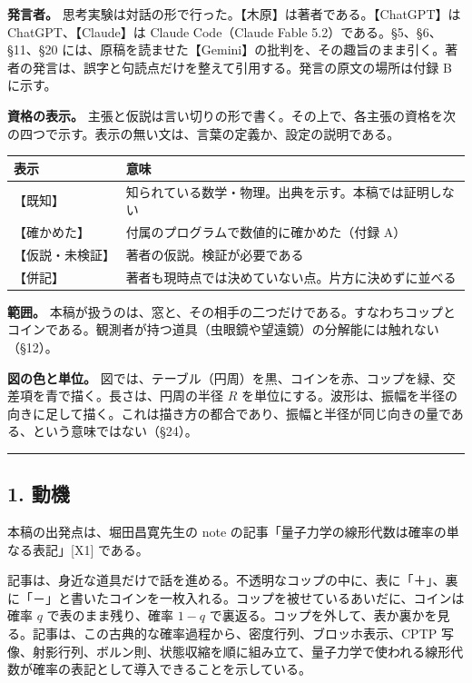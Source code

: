 \documentclass[
  a4paper,
]{ltjsarticle}
\newcounter{none} %
\begin{document}
\textbf{発言者。}
思考実験は対話の形で行った。【木原】は著者である。【ChatGPT】は
ChatGPT、【Claude】は Claude Code（Claude Fable
5.2）である。§5、§6、§11、§20
には、原稿を読ませた【Gemini】の批判を、その趣旨のまま引く。著者の発言は、誤字と句読点だけを整えて引用する。発言の原文の場所は付録
B に示す。

\textbf{資格の表示。}
主張と仮説は言い切りの形で書く。その上で、各主張の資格を次の四つで示す。表示の無い文は、言葉の定義か、設定の説明である。

{\def\LTcaptype{none} %
\begin{longtable}[]{@{}ll@{}}
\toprule\noalign{}
表示 & 意味 \\
\midrule\noalign{}
\endhead
\bottomrule\noalign{}
\endlastfoot
【既知】 & 知られている数学・物理。出典を示す。本稿では証明しない \\
【確かめた】 & 付属のプログラムで数値的に確かめた（付録 A） \\
【仮説・未検証】 & 著者の仮説。検証が必要である \\
【併記】 & 著者も現時点では決めていない点。片方に決めずに並べる \\
\end{longtable}
}

\textbf{範囲。}
本稿が扱うのは、窓と、その相手の二つだけである。すなわちコップとコインである。観測者が持つ道具（虫眼鏡や望遠鏡）の分解能には触れない（§12）。

\textbf{図の色と単位。}
図では、テーブル（円周）を黒、コインを赤、コップを緑、交差項を青で描く。長さは、円周の半径
\(R\)
を単位にする。波形は、振幅を半径の向きに足して描く。これは描き方の都合であり、振幅と半径が同じ向きの量である、という意味ではない（§24）。

\begin{center}\rule{0.5\linewidth}{0.5pt}\end{center}

\subsection{1. 動機}\label{ux52d5ux6a5f}

本稿の出発点は、堀田昌寛先生の note
の記事「量子力学の線形代数は確率の単なる表記」{[}X1{]} である。

記事は、身近な道具だけで話を進める。不透明なコップの中に、表に「＋」、裏に「－」と書いたコインを一枚入れる。コップを被せているあいだに、コインは確率
\(q\) で表のまま残り、確率 \(1-q\)
で裏返る。コップを外して、表か裏かを見る。記事は、この古典的な確率過程から、密度行列、ブロッホ表示、CPTP
写像、射影行列、ボルン則、状態収縮を順に組み立て、量子力学で使われる線形代数が確率の表記として導入できることを示している。
\end{document}
